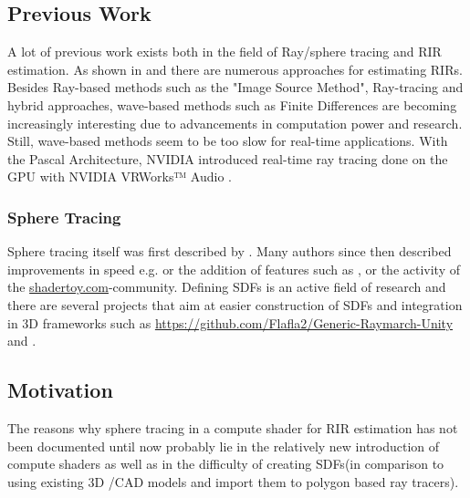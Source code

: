 \documentclass[twoside,a4paper]{article}
\begin{document}
\subsection{Previous Work}
\label{ssec:prev}
A lot of previous work exists both in the field of Ray/sphere tracing and RIR estimation.
As shown in \cite{alpkocak_computing_2010} and \cite{brinkmann_round_2019} there are numerous approaches for estimating RIRs. Besides Ray-based methods such as the "Image Source Method", Ray-tracing and hybrid approaches, wave-based methods such as Finite Differences are becoming increasingly interesting due to advancements in computation power and research. Still, wave-based methods seem to be too slow for real-time applications. With the Pascal Architecture, NVIDIA introduced real-time ray tracing done on the GPU with NVIDIA VRWorks™ Audio \cite{noauthor_vrworks_nodate}.






\subsubsection*{Sphere Tracing}
Sphere tracing itself was first described by \cite{hart_sphere_1996}. Many authors since then described improvements in speed e.g. \cite{balint_accelerating_2018} or the addition of features such as \cite{quilez_inigo_nodate}, \cite{keinert_enhanced_2014} or the activity of the \href{www.shadertoy.com}{shadertoy.com}-community.
Defining SDFs is an active field of research and there are several projects that aim at easier construction of SDFs and integration in 3D frameworks such as \href{https://github.com/Flafla2/Generic-Raymarch-Unity}{https://github.com/Flafla2/Generic-Raymarch-Unity} and \cite{lechner_hrtlacektdraymarchtoolkit_2020}.



\subsection{Motivation}
\label{subs:mot}
The reasons why sphere tracing in a compute shader for RIR estimation has not been documented until now probably lie in the relatively new introduction of compute shaders as well as in the difficulty of creating SDFs(in comparison to using existing 3D /CAD models and import them to polygon based ray tracers).
\end{document}
